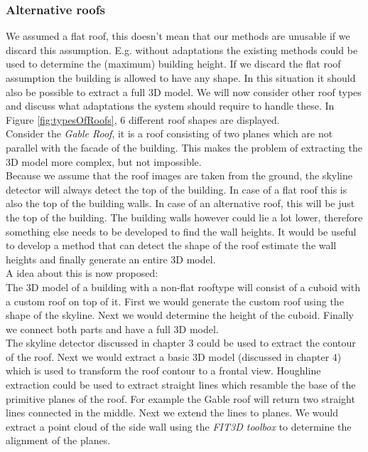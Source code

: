 \subsubsection{Alternative roofs}
We assumed a flat roof, this doesn't mean that our methods are unusable if
we discard this assumption.
E.g. without adaptations the existing methods could be used to determine the (maximum)
building height. 
If we discard the flat roof assumption the building is allowed to have any
shape. In this situation it should also be possible to extract a
full 3D model.  We will now consider other roof types and discuss what
adaptations the system should require to handle these.  In Figure
\ref{fig:typesOfRoofs}, 6 different roof shapes are displayed.\\

Consider the \emph{Gable Roof}, it is a roof consisting of two planes
which are not parallel with the facade of the building. This makes the problem
of extracting the 3D model more complex, but not impossible. \\
Because we assume that the roof images are taken from the ground, the skyline
detector will always detect the top of the building. In case of a flat roof
this is also the top of the building walls. In case of an
alternative roof, this will be just the top of the building. The building walls however
could lie a lot lower, therefore something else needs to be developed to find the wall
heights. It would be useful to develop a method that can detect the shape of the roof 
estimate the wall heights and finally generate an entire 3D model.\\
A idea about this is now proposed:\\

The 3D model of a building with a non-flat rooftype will consist of a cuboid 
with a custom roof on top of it.  First we would generate the custom roof 
using the shape of the skyline.  Next we would determine the height of the
cuboid. Finally we connect both parts and have a full 3D model.\\

The skyline detector discussed in chapter 3 could be used to extract the contour
of the roof. Next we would extract a basic 3D model (discussed in chapter 4) which
is used to transform the roof contour to a frontal view.  Houghline
extraction could be used to extract straight lines which resamble the base of
the primitive planes of the roof.  For example the Gable roof will return two
straight lines connected in the middle. Next we extend the lines to planes.
We would extract a point cloud of the side wall using the \emph{FIT3D toolbox\cite{FIT3D}} 
to determine the alignment of the planes.\\


